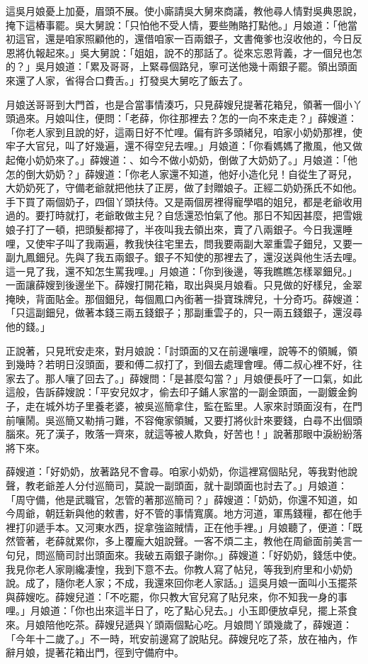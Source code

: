 這吳月娘憂上加憂，眉頭不展。使小廝請吳大舅來商議，教他尋人情對吳典恩說，掩下這樁事罷。吳大舅說：「只怕他不受人情，要些賄賂打點他。」月娘道：「他當初這官，還是咱家照顧他的，還借咱家一百兩銀子，文書俺爹也沒收他的，今日反恩將仇報起來。」吳大舅說：「姐姐，說不的那話了。從來忘恩背義，才一個兒也怎的？」吳月娘道：「累及哥哥，上緊尋個路兒，寧可送他幾十兩銀子罷。領出頭面來還了人家，省得合口費舌。」打發吳大舅吃了飯去了。

月娘送哥哥到大門首，也是合當事情湊巧，只見薛嫂兒提著花箱兒，領著一個小丫頭過來。月娘叫住，便問：「老薛，你往那裡去？怎的一向不來走走？」薛嫂道： 「你老人家到且說的好，這兩日好不忙哩。偏有許多頭緒兒，咱家小奶奶那裡，使牢子大官兒，叫了好幾遍，還不得空兒去哩。」月娘道：「你看媽媽了撒風，他又做起俺小奶奶來了。」薛嫂道：、如今不做小奶奶，倒做了大奶奶了。」月娘道：「他怎的倒大奶奶？」薛嫂道：「你老人家還不知道，他好小造化兒！自從生了哥兒，大奶奶死了，守備老爺就把他扶了正房，做了封贈娘子。正經二奶奶孫氏不如他。手下買了兩個奶子，四個丫頭扶侍。又是兩個房裡得寵學唱的姐兒，都是老爺收用過的。要打時就打，老爺敢做主兒？自恁還恐怕氣了他。那日不知因甚麼，把雪娥娘子打了一頓，把頭髮都撏了，半夜叫我去領出來，賣了八兩銀子。今日我還睡哩，又使牢子叫了我兩遍，教我快往宅里去，問我要兩副大翠重雲子鈿兒，又要一副九鳳鈿兒。先與了我五兩銀子。銀子不知使的那裡去了，還沒送與他生活去哩。這一見了我，還不知怎生罵我哩。」月娘道：「你到後邊，等我瞧瞧怎樣翠鈿兒。」一面讓薛嫂到後邊坐下。薛嫂打開花箱，取出與吳月娘看。只見做的好樣兒，金翠掩映，背面貼金。那個鈿兒，每個鳳口內銜著一掛寶珠牌兒，十分奇巧。薛嫂道：「只這副鈿兒，做著本錢三兩五錢銀子；那副重雲子的，只一兩五錢銀子，還沒尋他的錢。」

正說著，只見玳安走來，對月娘說：「討頭面的又在前邊嚷哩，說等不的領贓，領到幾時？若明日沒頭面，要和傅二叔打了，到個去處理會哩。傅二叔心裡不好，往家去了。那人嚷了回去了。」薛嫂問：「是甚麼勾當？」月娘便長吁了一口氣，如此這般，告訴薛嫂說：「平安兒奴才，偷去印子鋪人家當的一副金頭面，一副鍍金鉤子，走在城外坊子里養老婆，被吳巡簡拿住，監在監里。人家來討頭面沒有，在門前嚷鬧。吳巡簡又勒掯刁難，不容俺家領贓，又要打將伙計來要錢，白尋不出個頭腦來。死了漢子，敗落一齊來，就這等被人欺負，好苦也！」說著那眼中淚紛紛落將下來。

薛嫂道：「好奶奶，放著路兒不會尋。咱家小奶奶，你這裡寫個貼兒，等我對他說聲，教老爺差人分付巡簡司，莫說一副頭面，就十副頭面也討去了。」月娘道： 「周守備，他是武職官，怎管的著那巡簡司？」薛嫂道：「奶奶，你還不知道，如今周爺，朝廷新與他的敕書，好不管的事情寬廣。地方河道，軍馬錢糧，都在他手裡打卯遞手本。又河東水西，捉拿強盜賊情，正在他手裡。」月娘聽了，便道：「既然管著，老薛就累你，多上覆龐大姐說聲。一客不煩二主，教他在周爺面前美言一句兒，問巡簡司討出頭面來。我破五兩銀子謝你。」薛嫂道：「好奶奶，錢恁中使。我見你老人家剛纔凄惶，我到下意不去。你教人寫了帖兒，等我到府里和小奶奶說。成了，隨你老人家；不成，我還來回你老人家話。」這吳月娘一面叫小玉擺茶與薛嫂吃。薛嫂兒道：「不吃罷，你只教大官兒寫了貼兒來，你不知我一身的事哩。」月娘道：「你也出來這半日了，吃了點心兒去。」小玉即便放卓兒，擺上茶食來。月娘陪他吃茶。薛嫂兒遞與丫頭兩個點心吃。月娘問丫頭幾歲了，薛嫂道： 「今年十二歲了。」不一時，玳安前邊寫了說貼兒。薛嫂兒吃了茶，放在袖內，作辭月娘，提著花箱出門，徑到守備府中。

